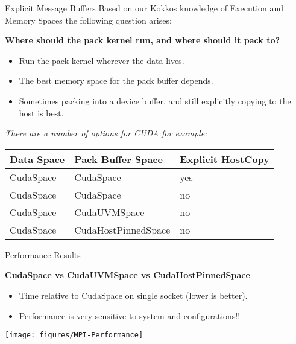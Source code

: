 \begin{frame}[fragile]{Explicit Message Buffers}
Based on our Kokkos knowledge of Execution and Memory Spaces the following question arises:

\textbf{Where should the pack kernel run, and where should it pack to?}

\begin{itemize}
  \item Run the pack kernel wherever the data lives.
  \item The best memory space for the pack buffer depends.
  \item Sometimes packing into a device buffer, and still explicitly copying to the host is best.
\end{itemize}

\textit{There are a number of options for CUDA for example:}

\vspace{5pt}
\begin{tabular}{l|l|l}
\textbf{Data Space} & \textbf{Pack Buffer Space} & \textbf{Explicit HostCopy} \\ \hline
CudaSpace & CudaSpace & yes \\
CudaSpace & CudaSpace & no \\
CudaSpace & CudaUVMSpace & no \\
CudaSpace & CudaHostPinnedSpace & no \\
\end{tabular}

\end{frame}

\begin{frame}[fragile]{Performance Results}

\textbf{CudaSpace vs CudaUVMSpace vs CudaHostPinnedSpace}
\begin{itemize}
\item Time relative to CudaSpace on single socket (lower is better).
\item Performance is very sensitive to system and configurations!!
\end{itemize}

\pause
\texttt{[image: figures/MPI-Performance]}
\end{frame}

